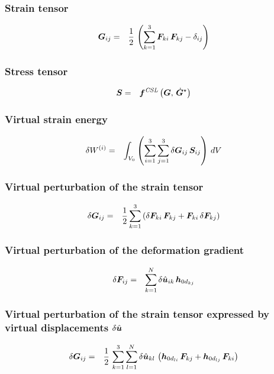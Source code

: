 \subsubsection{Strain tensor}
\begin{eqnarray}
\bm{G}_{ij} & = & \frac{1}{2} \, \left(\sum_{k=1}^3\bm{F}_{ki}\,\bm{F}_{kj} - \delta_{ij}\right)
\end{eqnarray}

\subsubsection{Stress tensor}
\begin{eqnarray}
\bm{S} & = & \bm{f}^{\mathit{CSL}}\left(\bm{G}, \, \dot{\bm{G}}^{\star}\right)
\end{eqnarray}

\subsubsection{Virtual strain energy}
\begin{eqnarray}
\delta W^{(i)} & = & \int_{V_0} \left(\sum_{i=1}^3\sum_{j=1}^3 \delta \bm{G}_{ij} \, \bm{S}_{ij} \right) \, dV
\end{eqnarray}

\subsubsection{Virtual perturbation of the strain tensor}
\begin{eqnarray}
\delta \bm{G}_{ij} & = & \frac{1}{2} \sum_{k=1}^3\left(\delta \bm{F}_{ki} \, \bm{F}_{kj} + \bm{F}_{ki} \, \delta \bm{F}_{kj}\right)
\end{eqnarray}

\subsubsection{Virtual perturbation of the deformation gradient}
\begin{eqnarray}
\delta \bm{F}_{ij} & = & \sum_{k=1}^N \delta \hat{\bm{u}}_{ik} \, \bm{h}_{0d_{kj}}
\end{eqnarray}

\subsubsection{Virtual perturbation of the strain tensor expressed by virtual displacements $\delta{\hat{\bm{u}}}$}
\begin{eqnarray}
\delta \bm{G}_{ij} & = & \frac{1}{2} \, \sum_{k=1}^3 \sum_{l=1}^N \delta \hat{\bm{u}}_{kl} \, \left( \bm{h}_{0d_{li}} \, \bm{F}_{kj} + \bm{h}_{0d_{lj}} \, \bm{F}_{ki} \right)
\end{eqnarray}

